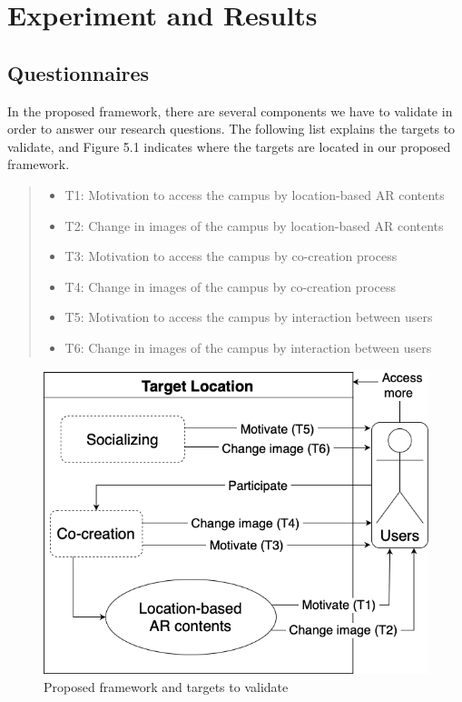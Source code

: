 \chapter{Experiment and Results}\label{ch:5}

\section{Questionnaires}

In the proposed framework, there are several components we have to validate in order to answer our research questions.
The following list explains the targets to validate, and Figure 5.1 indicates where the targets are located in our proposed framework.

\begin{quote}
  \begin{itemize}
    \item T1: Motivation to access the campus by location-based AR contents
    \item T2: Change in images of the campus by location-based AR contents
    \item T3: Motivation to access the campus by co-creation process
    \item T4: Change in images of the campus by co-creation process
    \item T5: Motivation to access the campus by interaction between users
    \item T6: Change in images of the campus by interaction between users
  \end{itemize}
\end{quote}

\begin{figure}[ht]
  \centering
  \includegraphics[width=0.8\columnwidth]{resources/5_experiment_and_results/proposed_framework_with_validate_targets.png}
    \caption{Proposed framework and targets to validate}
\end{figure}

